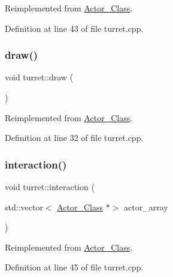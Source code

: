 Reimplemented from \hyperlink{class_actor___class_a9447c6154a674d7e6bdf24ff2874b7a8}{Actor\+\_\+\+Class}.



Definition at line 43 of file turret.\+cpp.

\hypertarget{classturret_ae396c3a39ef7556070e1a0b55bea2970}{}\label{classturret_ae396c3a39ef7556070e1a0b55bea2970} 
\subsubsection{\texorpdfstring{draw()}{draw()}}
{\footnotesize\ttfamily void turret\+::draw (\begin{DoxyParamCaption}{ }\end{DoxyParamCaption})\hspace{0.3cm}{\ttfamily [virtual]}}



Reimplemented from \hyperlink{class_actor___class_ac49cd62be76b4b950ecbe155413f1b64}{Actor\+\_\+\+Class}.



Definition at line 32 of file turret.\+cpp.

\hypertarget{classturret_aa6733d8f9b2d5773271a1ed3b4b88aab}{}\label{classturret_aa6733d8f9b2d5773271a1ed3b4b88aab} 
\subsubsection{\texorpdfstring{interaction()}{interaction()}}
{\footnotesize\ttfamily void turret\+::interaction (\begin{DoxyParamCaption}\item[{std\+::vector$<$ \hyperlink{class_actor___class}{Actor\+\_\+\+Class} $\ast$$>$}]{actor\+\_\+array }\end{DoxyParamCaption})\hspace{0.3cm}{\ttfamily [virtual]}}



Reimplemented from \hyperlink{class_actor___class_a87d1e079d8576fa99592a60b38a04a1b}{Actor\+\_\+\+Class}.



Definition at line 45 of file turret.\+cpp.

\hypertarget{classturret_a6c97760cdfa379ce956c3f5d773c9f4e}{}\label{classturret_a6c97760cdfa379ce956c3f5d773c9f4e} 
